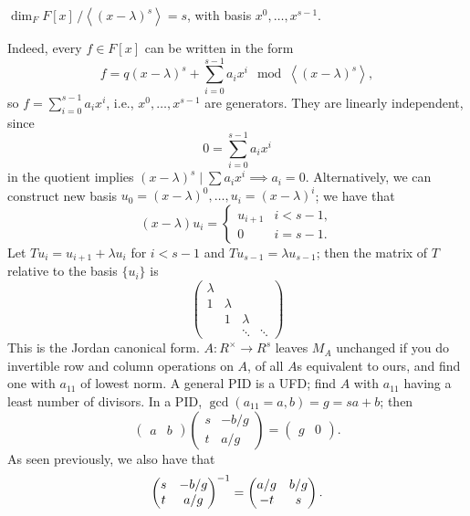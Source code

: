 \begin{claim}
    $\dim_F F[x]\,/\!\left<(x - \lambda)^s\right> = s$, with basis $x^0, \dots, x^{s-1}$.
\end{claim}
Indeed, every $f \in F[x]$ can be written in the form
\[ f = q(x - \lambda)^s + \sum_{i=0}^{s-1} a_i x^i \mod \left<(x - \lambda)^s\right>, \]
so $f = \sum_{i=0}^{s-1} a_i x^i$, i.e., $x^0, \dots, x^{s-1}$ are generators. They are linearly independent, since
\[ 0 = \sum_{i=0}^{s-1} a_i x^i \]
in the quotient implies $(x - \lambda)^s \mid \sum a_i x^i \implies a_i = 0$. Alternatively, we can construct new basis $u_0 = (x - \lambda)^0, \dots, u_i = (x - \lambda)^i$; we have that
\[ (x - \lambda) u_i = \begin{cases} u_{i+1} & i < s - 1, \\ 0 & i = s - 1. \end{cases} \]
Let $T u_i = u_{i+1} + \lambda u_i$ for $i < s-1$ and $T u_{s-1} = \lambda u_{s-1}$; then the matrix of $T$ relative to the basis $\{u_i\}$ is
\[ \begin{pmatrix} \lambda \\ 1 & \lambda \\ & 1 & \lambda \\ & & \ddots & \ddots \end{pmatrix} \]
This is the Jordan canonical form. $A \colon R^\times \to R^s$ leaves $M_A$ unchanged if you do invertible row and column operations on $A$, of all $A$s equivalent to ours, and find one with $a_{11}$ of lowest norm. A general PID is a UFD; find $A$ with $a_{11}$ having a least number of divisors. In a PID, $\gcd(a_{11} = a, b) = g = sa + b$; then
\[ \begin{pmatrix} a & b \end{pmatrix} \begin{pmatrix} s & -b/g \\ t & a/g \end{pmatrix} = \begin{pmatrix} g & 0 \end{pmatrix}. \]
As seen previously, we also have that
\[ \begin{pmatrix} s & -b/g \\ t & a/g \end{pmatrix}^{-1} = \begin{pmatrix} a/g & b/g \\ -t & s \end{pmatrix}. \]
